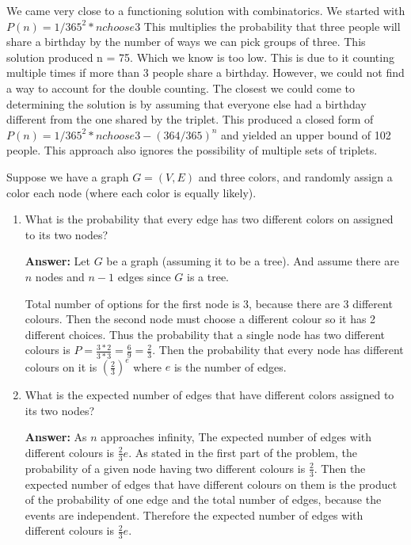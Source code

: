 \documentclass{article}
\begin{document}
We came very close to a functioning solution with combinatorics. We started with $P(n) = 1/365^2 * {n choose 3}$ This multiplies the probability that three people will share a birthday by the number of ways we can pick groups of three. This solution produced n = 75. Which we know is too low. This is due to it counting multiple times if more than 3 people share a birthday. However, we could not find a way to account for the double counting. The closest we could come to determining the solution is by assuming that everyone else had a birthday different from the one shared by the triplet. This produced a closed form of $P(n) = 1/365^2 * {n choose 3} - (364/365)^n$ and yielded an upper bound of 102 people. This approach also ignores the possibility of multiple sets of triplets. 


\nextprob
Suppose we have a graph $G=(V,E)$ and three colors, and randomly assign a color
each node (where each color is equally likely).
\begin{enumerate}
   \item What is the probability that every edge has two different colors on
        assigned to its two nodes?
        
        \textbf{Answer:} Let $G$ be a graph (assuming it to be a tree). And assume there are $n$ nodes and $n-1$ edges since $G$ is a tree.
        
        Total number of options for the first node is 3, because there are 3 different colours. Then the second node must choose a different colour so it has 2 different choices. Thus the probability that a single node has two different colours is $P = \frac{3*2}{3*3} = \frac{6}{9} = \frac{2}{3}$. Then the probability that every node has different colours on it is $(\frac{2}{3})^e$ where $e$ is the number of edges.
               
    \item What is the expected number of edges that have different colors
        assigned to its two nodes?
        
        \textbf{Answer:} As $n$ approaches infinity, The expected number of edges with different colours is $\frac{2}{3} e$. As stated in the first part of the problem, the probability of a given node having two different colours is $\frac{2}{3}$. Then the expected number of edges that have different colours on them is the product of the probability of one edge and the total number of edges, because the events are independent. Therefore the expected number of edges with different colours is $\frac{2}{3} e$.
        
\end{enumerate}
\end{document}
